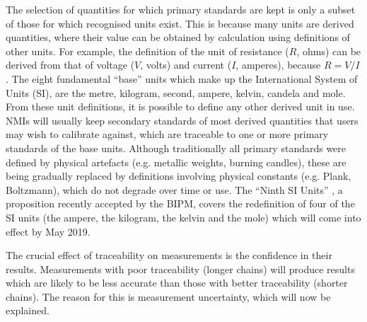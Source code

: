 \documentclass[../thesis/thesis.tex]{subfiles}
\begin{document}
\begin{refsection}
The selection of quantities for which primary standards are kept is only a subset of those for which recognised units exist. This is because many units are derived quantities, where their value can be obtained by calculation using definitions of other units. For example, the definition of the unit of resistance ($R$, ohms) can be derived from that of voltage ($V$, volts) and current ($I$, amperes), because $R=V/I$. The eight fundamental ``base'' units which make up the International System of Units (SI), are the metre, kilogram, second, ampere, kelvin, candela and mole. From these unit definitions, it is possible to define any other derived unit in use. NMIs will usually keep secondary standards of most derived quantities that users may wish to calibrate against, which are traceable to one or more primary standards of the base units. Although traditionally all primary standards were defined by physical artefacts (e.g. metallic weights, burning candles), these are being gradually replaced by definitions involving physical constants (e.g. Plank, Boltzmann), which do not degrade over time or use. The ``Ninth SI Units'' \cite{SI}, a proposition recently accepted by the BIPM, covers the redefinition of four of the SI units (the ampere, the kilogram, the kelvin and the mole) which will come into effect by May 2019.

The crucial effect of traceability on measurements is the confidence in their results. Measurements with poor traceability (longer chains) will produce results which are likely to be less accurate than those with better traceability (shorter chains). The reason for this is measurement uncertainty, which will now be explained.


\end{refsection}
\end{document}
